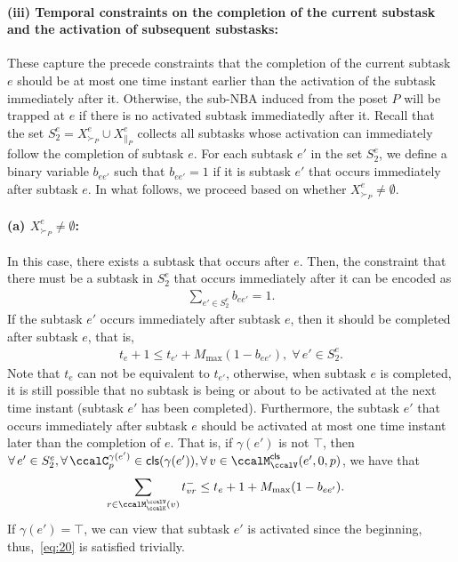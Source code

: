 \documentclass[Afour,sageh,times]{sagej}
\newcommand{\clause}[1]{\mathsf{cls}(#1)}
\begin{document}
{{{\paragraph{(iii)  Temporal constraints on  the  completion of the current substask and the activation  of subsequent substasks:}
These capture the precede constraints that the completion of the current subtask $e$ should be at most one time instant earlier than the activation of the subtask immediately after it. Otherwise, the sub-NBA induced from the poset $P$ will be trapped at $e$ if there is no activated subtask immediatedly after it. Recall that the set  $S_2^e = X^e_{\succ_{P}} \cup X^e_{\|_{P}}$ collects all subtasks whose activation can immediately follow the completion of subtask $e$. For each subtask $e'$ in the set $S_2^e$, we define a binary variable $b_{ee'}$ such that  $b_{ee'}=1$ if it is subtask $e'$ that occurs immediately after subtask $e$. In what follows, we proceed based on whether $ X^e_{\succ_{P}} \neq \emptyset$.

\paragraph{(a) $ X^e_{\succ_{P}} \neq \emptyset$:}\label{activation:a} In this case, there exists a subtask that occurs after $e$. Then, the  constraint that there must be a subtask in $S_2^e$ that occurs immediately after it can be encoded as
\begingroup\makeatletter\def\f@size{10}\check@mathfonts
\def\maketag@@@#1{\hbox{\m@th\normalsize\normalfont#1}}%
\begin{align}\label{eq:bafter}
 \sum_{e'\in  S_2^e} b_{ee'} = 1.
\end{align}
\endgroup
If the subtask $e'$ occurs immediately  after subtask $e$, then it should be completed after subtask $e$, that is,
\begingroup\makeatletter\def\f@size{10}\check@mathfonts
\def\maketag@@@#1{\hbox{\m@th\normalsize\normalfont#1}}%
\begin{align}\label{eq:after}
  t_e + 1 \leq  t_{e'} + M_{\text{max}} (1 - b_{ee'}),\; \forall\, e' \in S_2^e.
\end{align}
\endgroup
Note that $t_e$ can not be equivalent to $t_{e'}$, otherwise, when subtask $e$ is completed, it is still possible that no subtask is being or about to be activated  at the next time instant (subtask $e'$ has been completed). Furthermore, the subtask $e'$ that occurs immediately  after subtask $e$ should be activated at most one time instant later than the completion of $e$. That is,  if $\gamma(e')$ is not $\top$, then $\forall\, e' \in S_2^e, \forall \, \ccalC_p^{\gamma(e')} \in \clause{\gamma(e')} , \forall \,v \in \ccalM^\mathsf{cls}_\ccalV(e',0,p)$, we have that
\begingroup\makeatletter\def\f@size{10}\check@mathfonts
\def\maketag@@@#1{\hbox{\m@th\normalsize\normalfont#1}}%
\begin{align}\label{eq:20}
  & \sum_{r\in \ccalM^\ccalV_{\ccalK}(v)} t_{vr}^-   \leq t_{e}  + 1 + M_{\text{max}} (1 - b_{ee'}).
\end{align}
\endgroup
If $\gamma(e')=\top$, we can view that subtask $e'$ is activated since the beginning, thus,~\eqref{eq:20} is satisfied trivially.

}}}
\end{document}
